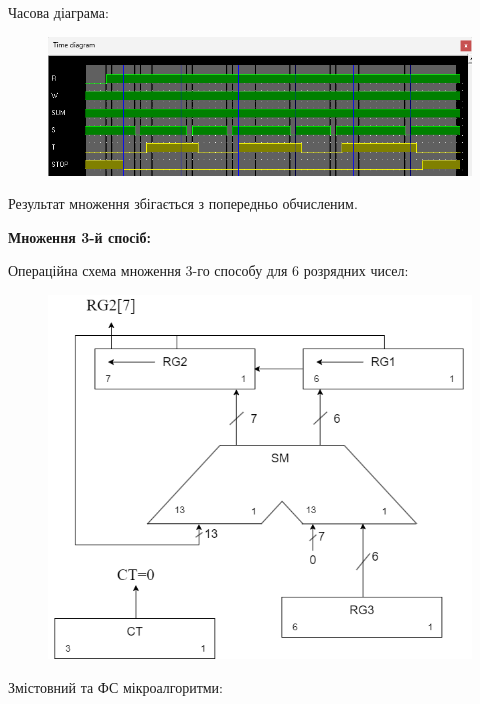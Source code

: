 \documentclass[12pt,a4paper]{article}
\begin{document}
    Часова діаграма:

    \begin{figure}[ht]
        \includegraphics[width=1.0\textwidth]{time1.png}
    \end{figure}

    Результат множення збігається з попередньо обчисленим.

    \newpage

    \textbf{\large Множення 3-й спосіб:}

    \vspace{1em}

    Операційна схема множення 3-го способу для 6 розрядних чисел:

    \begin{figure}[ht]
        \includegraphics[width=1.0\textwidth]{multiply3_operation_schemma.png}
    \end{figure}

    \newpage

    Змістовний та ФС мікроалгоритми:
\end{document}
